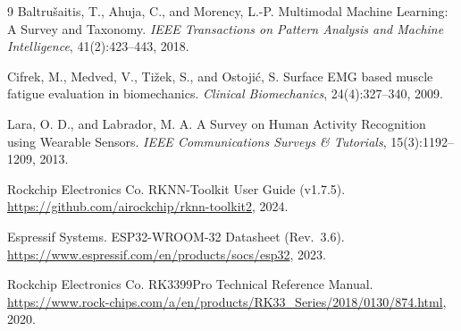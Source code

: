 \documentclass[UTF8,a4paper,12pt]{ctexart}
\begin{document}
\begin{thebibliography}{9}
Baltru\v{s}aitis, T., Ahuja, C., and Morency, L.-P.
\newblock Multimodal Machine Learning: A Survey and Taxonomy.
\newblock \emph{IEEE Transactions on Pattern Analysis and Machine Intelligence},
41(2):423--443, 2018.

Cifrek, M., Medved, V., Ti\v{z}ek, S., and Ostoji\'c, S.
\newblock Surface EMG based muscle fatigue evaluation in biomechanics.
\newblock \emph{Clinical Biomechanics}, 24(4):327--340, 2009.

Lara, O. D., and Labrador, M. A.
\newblock A Survey on Human Activity Recognition using Wearable Sensors.
\newblock \emph{IEEE Communications Surveys \& Tutorials}, 15(3):1192--1209, 2013.

Rockchip Electronics Co.
\newblock RKNN-Toolkit User Guide (v1.7.5).
\newblock \url{https://github.com/airockchip/rknn-toolkit2}, 2024.

Espressif Systems.
\newblock ESP32-WROOM-32 Datasheet (Rev.~3.6).
\newblock \url{https://www.espressif.com/en/products/socs/esp32}, 2023.

Rockchip Electronics Co.
\newblock RK3399Pro Technical Reference Manual.
\newblock \url{https://www.rock-chips.com/a/en/products/RK33_Series/2018/0130/874.html}, 2020.
\end{thebibliography}
\end{document}

